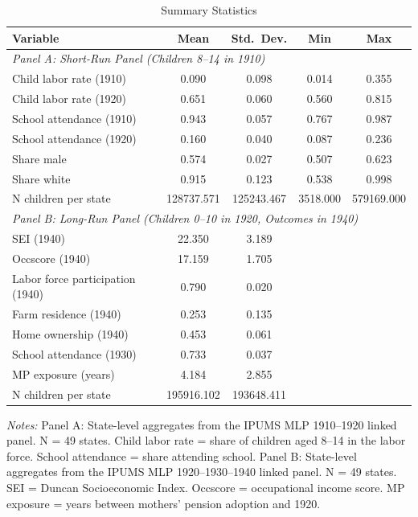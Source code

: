 \begin{table}[H]
\centering
\caption{Summary Statistics}
\begin{threeparttable}
\begin{tabular}{lcccc}
\toprule
Variable & Mean & Std.~Dev. & Min & Max \\
\midrule
\multicolumn{5}{l}{\textit{Panel A: Short-Run Panel (Children 8--14 in 1910)}} \\[3pt]
Child labor rate (1910) & 0.090 & 0.098 & 0.014 & 0.355 \\
Child labor rate (1920) & 0.651 & 0.060 & 0.560 & 0.815 \\
School attendance (1910) & 0.943 & 0.057 & 0.767 & 0.987 \\
School attendance (1920) & 0.160 & 0.040 & 0.087 & 0.236 \\
Share male & 0.574 & 0.027 & 0.507 & 0.623 \\
Share white & 0.915 & 0.123 & 0.538 & 0.998 \\
N children per state & 128737.571 & 125243.467 & 3518.000 & 579169.000 \\
[6pt]
\multicolumn{5}{l}{\textit{Panel B: Long-Run Panel (Children 0--10 in 1920, Outcomes in 1940)}} \\[3pt]
SEI (1940) & 22.350 & 3.189 & & \\
Occscore (1940) & 17.159 & 1.705 & & \\
Labor force participation (1940) & 0.790 & 0.020 & & \\
Farm residence (1940) & 0.253 & 0.135 & & \\
Home ownership (1940) & 0.453 & 0.061 & & \\
School attendance (1930) & 0.733 & 0.037 & & \\
MP exposure (years) & 4.184 & 2.855 & & \\
N children per state & 195916.102 & 193648.411 & & \\
\bottomrule
\end{tabular}
\begin{tablenotes}[flushleft]
\small
\item \textit{Notes:} Panel A: State-level aggregates from the IPUMS MLP 1910--1920 linked panel. N = 49 states. Child labor rate = share of children aged 8--14 in the labor force. School attendance = share attending school. Panel B: State-level aggregates from the IPUMS MLP 1920--1930--1940 linked panel. N = 49 states. SEI = Duncan Socioeconomic Index. Occscore = occupational income score. MP exposure = years between mothers' pension adoption and 1920.
\end{tablenotes}
\end{threeparttable}
\label{tab:summary}
\end{table}
